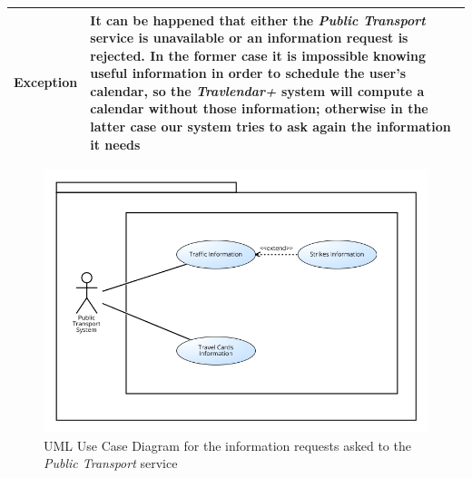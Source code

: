 \begin{table}[H]
\begin{tabular}{|p{3.5cm}|p{10.3cm}|}
    \hline
    \textbf{\large{Exception}} 			& It can be happened that either the \emph{Public Transport} service is unavailable or an information request is rejected. In the former case it is impossible knowing useful information in order to schedule the user's calendar, so the \emph{Travlendar+} system will compute a calendar without those information; otherwise in the latter case our system tries to ask again the information it needs\\
    
    \hline
    
    
    \end{tabular}
	
\end{table}

\begin{figure}[H]
\centering
\includegraphics[scale=0.5]{Pictures/UseCaseDiagram/ATM.png}
\caption{UML Use Case Diagram for the information requests asked to the \emph{Public Transport} service}
\end{figure}